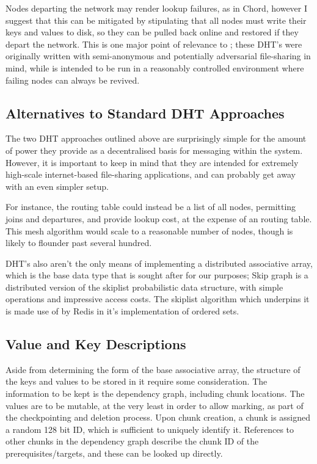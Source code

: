 Nodes departing the network may render lookup failures, as in Chord, however I suggest that this can be mitigated by stipulating that all nodes must write their keys and values to disk, so they can be pulled back online and restored if they depart the network.
This is one major point of relevance to \lsr{}; these DHT's were originally written with semi-anonymous and potentially adversarial file-sharing in mind, while \lsr{} is intended to be run in a reasonably controlled environment where failing nodes can always be revived.

\subsection{Alternatives to Standard DHT Approaches}

The two DHT approaches outlined above are surprisingly simple for the amount of power they provide as a decentralised basis for messaging within the system.
However, it is important to keep in mind that they are intended for extremely high-scale internet-based file-sharing applications, and \lsr{} can probably get away with an even simpler setup.

For instance, the routing table could instead be a list of all nodes, permitting joins and departures, and provide  lookup cost, at the expense of an  routing table.
This mesh algorithm would scale to a reasonable number of nodes, though is likely to flounder past several hundred.

DHT's also aren't the only means of implementing a distributed associative array, which is the base data type that is sought after for our purposes;
Skip graph is a distributed version of the skiplist probabilistic data structure, with simple operations and impressive access costs\cite{aspnes2007skipgraph}.
The skiplist algorithm which underpins it is made use of by Redis in it's implementation of ordered sets.

\subsection{Value and Key Descriptions}

Aside from determining the form of the base associative array, the structure of the keys and values to be stored in it require some consideration.
The information to be kept is the dependency graph, including chunk locations.
The values are to be mutable, at the very least in order to allow marking, as part of the checkpointing and deletion process.
Upon chunk creation, a chunk is assigned a random 128 bit ID, which is sufficient to uniquely identify it.
References to other chunks in the dependency graph describe the chunk ID of the prerequisites/targets, and these can be looked up directly.

